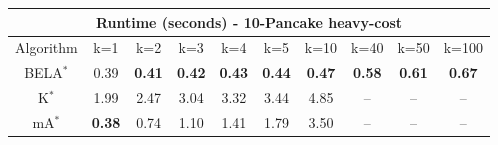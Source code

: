 \begin{tabular}{c|ccccccccc}\toprule
\multicolumn{10}{c}{Runtime (seconds) - 10-Pancake heavy-cost}\\ \midrule
Algorithm & k=1 & k=2 & k=3 & k=4 & k=5 & k=10 & k=40 & k=50 & k=100 \\ \midrule
BELA$^*$ & 0.39 & \textbf{0.41} & \textbf{0.42} & \textbf{0.43} & \textbf{0.44} & \textbf{0.47} & \textbf{0.58} & \textbf{0.61} & \textbf{0.67} \\
K$^*$ & 1.99 & 2.47 & 3.04 & 3.32 & 3.44 & 4.85 & -- & -- & -- \\
mA$^*$ & \textbf{0.38} & 0.74 & 1.10 & 1.41 & 1.79 & 3.50 & -- & -- & -- \\ \bottomrule 
\end{tabular}
